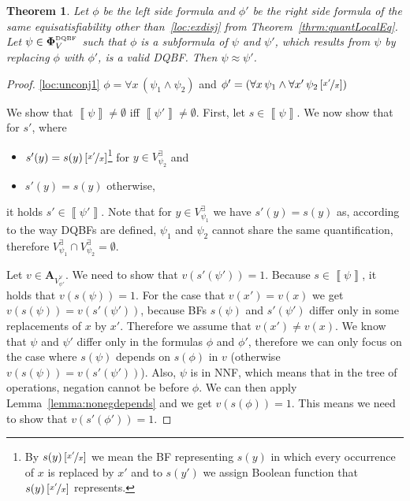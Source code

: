 \documentclass[
  digital, %
  color,
  twoside, %
  table,   %
  nolof,     %
  nolot,     %
]{fithesis3}
\newtheorem{theorem}{Theorem}[chapter] %
\theoremstyle{definition}
\theoremstyle{remark}
\newcommand{\seman}[1]{\left\llbracket {#1} \right\rrbracket}
\newcommand{\substitute}[2]{\left[ \nicefrac{#2}{#1} \right]}
\newcommand{\DQBF}[1]{\mathbf{\Phi}_{#1}^{\normalfont{\text{\tiny DQBF}}}}
\newcommand{\valtns}[1]{\mathbf{A}_{#1}}
\newcommand{\evars}[1]{V_{#1}^{\exists}}
\newcommand{\uvars}[1]{V_{#1}^{\forall}}
\newcommand{\itholds}{\,}
\begin{document}
\begin{theorem}
  \label{thrm:quantLocalSubformulas}
  Let $\phi$ be the left side formula and $\phi'$ be the right side formula of the same equisatisfiability other than~\eqref{loc:exdisj} from Theorem~\ref{thrm:quantLocalEq}. Let $\psi \in \DQBF{V}$ such that $\phi$ is a subformula of $\psi$ and $\psi'$, which results from $\psi$ by replacing $\phi$ with $\phi'$, is a valid DQBF. Then $\psi \approx \psi'$.
\end{theorem}
\begin{proof}
  \eqref{loc:unconj1} $\phi = \forall x \itholds (\psi_1 \land \psi_2)$ and $\phi' = \left(\forall x \itholds \psi_1 \land \forall x' \itholds \psi_2\substitute{x}{x'}\right)$
  
  We show that $\seman{\psi} \not= \emptyset$ iff $\seman{\psi'} \not= \emptyset$. First, let $s \in \seman{\psi}$. We now show that for $s'$, where 
  \begin{itemize}
      \item $s'(y) = s(y)\substitute{x}{x'}$\footnote{By $s(y)\substitute{x}{x'}$ we mean the BF representing $s(y)$ in which every occurrence of $x$ is replaced by $x'$ and to $s(y')$ we assign Boolean function that $s(y)\substitute{x}{x'}$ represents.} for $y \in \evars{\psi_2}$ and
      \item $s'(y) = s(y)$ otherwise,
  \end{itemize}
  it holds $s' \in \seman{\psi'}$. Note that for $y \in \evars{\psi_1}$ we have $s'(y) = s(y)$ as, according to the way DQBFs are defined, $\psi_1$ and $\psi_2$ cannot share the same quantification, therefore $\evars{\psi_1} \cap \evars{\psi_2} = \emptyset$.
  
  Let $v \in \valtns{\uvars{\psi'}}$. We need to show that $v(s'(\psi')) = 1$. Because $s \in \seman{\psi}$, it holds that $v(s(\psi)) = 1$. For the case that $v(x') = v(x)$ we get $v(s(\psi)) = v(s'(\psi'))$, because BFs $s(\psi)$ and $s'(\psi')$ differ only in some replacements of $x$ by $x'$. Therefore we assume that $v(x') \not= v(x)$. We know that $\psi$ and $\psi'$ differ only in the formulas $\phi$ and $\phi'$, therefore we can only focus on the case where $s(\psi)$ depends on $s(\phi)$ in $v$ (otherwise $v(s(\psi)) = v(s'(\psi'))$). %
  Also, $\psi$ is in NNF, which means that in the tree of operations, negation cannot be before $\phi$. We can then apply Lemma~\ref{lemma:nonegdepends} and we get $v(s(\phi)) = 1$.
  This means we need to show that $v(s'(\phi')) = 1$.
  

\end{proof}
\end{document}
